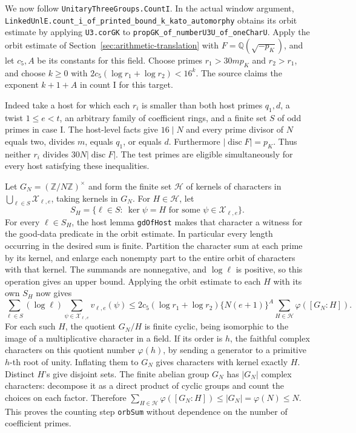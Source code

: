 We now follow \texttt{Unitary\allowbreak{}Three\allowbreak{}Groups.\allowbreak{}Count\allowbreak{}I}. In the actual
window argument, \texttt{Linked\allowbreak{}Unl\allowbreak{}E.\allowbreak{}count\_\allowbreak{}i\_\allowbreak{}of\_\allowbreak{}printed\_\allowbreak{}bound\_\allowbreak{}k\_\allowbreak{}kato\_\allowbreak{}automorphy}
obtains its orbit estimate by applying \texttt{U3.\allowbreak{}cor\allowbreak{}GK} to
\texttt{prop\allowbreak{}GK\_\allowbreak{}of\_\allowbreak{}number\allowbreak{}U3\allowbreak{}U\_\allowbreak{}of\_\allowbreak{}one\allowbreak{}Char\allowbreak{}U}. Apply the orbit estimate
of Section~\ref{sec:arithmetic-translation} with
\(F=\mathbb Q(\sqrt{-p_K})\), and let \(c_5,A\) be its constants for
this field. Choose primes \(r_1>30mp_K\) and \(r_2>r_1\), and choose
\(k\ge0\) with \(2c_5(\log r_1+\log r_2)<16^k\). The source
claims the exponent \(k+1+A\) in count I for this target.

Indeed take a host for which each \(r_i\) is smaller than both
host primes \(q_1,d\), a twist \(1\le e<t\), an arbitrary family of
coefficient rings, and a finite set \(S\) of odd primes in case I.
The host-level facts give \(16\mid N\) and every prime divisor of
\(N\) equals two, divides \(m\), equals \(q_1\), or equals \(d\).
Furthermore \(|\operatorname{disc}F|=p_K\). Thus neither \(r_i\)
divides \(30N|\operatorname{disc}F|\). The test primes are eligible
simultaneously for every host satisfying these inequalities.

Let \(G_N=(\mathbb Z/N\mathbb Z)^\times\) and form the finite set
\(\mathcal H\) of kernels of characters in
\(\bigcup_{\ell\in S}\mathcal X_{\ell,e}\), taking kernels in \(G_N\).
For \(H\in\mathcal H\), let
\[
  S_H=\{\ell\in S:\ \ker\psi=H
           \text{ for some }\psi\in\mathcal X_{\ell,e}\}.
\]
For every \(\ell\in S_H\), the host lemma \texttt{gd\allowbreak{}Of\allowbreak{}Host} makes that
character a witness for the good-data predicate in the orbit estimate.
In particular every length occurring in the desired sum is finite.
Partition the character sum at each prime by its kernel, and enlarge
each nonempty part to the entire orbit of characters with that kernel.
The summands are nonnegative, and \(\log\ell\) is positive, so this
operation gives an upper bound. Applying the orbit estimate to each
\(H\) with its own \(S_H\) now gives
\[
 \sum_{\ell\in S}(\log\ell)\sum_{\psi\in\mathcal X_{\ell,e}}
       v_{\ell,e}(\psi)
 \le
 2c_5(\log r_1+\log r_2)\{N(e+1)\}^A
        \sum_{H\in\mathcal H}\varphi([G_N:H]).
\]
For each such \(H\), the quotient \(G_N/H\) is finite cyclic, being
isomorphic to the image of a multiplicative character in a field.
If its order is \(h\), the faithful complex characters on this
quotient number \(\varphi(h)\), by sending a generator to a primitive
\(h\)-th root of unity. Inflating them to \(G_N\) gives characters
with kernel exactly \(H\). Distinct \(H\)'s give disjoint sets.
The finite abelian group \(G_N\) has \(|G_N|\) complex characters:
decompose it as a direct product of cyclic groups and count the
choices on each factor. Therefore
\(\sum_{H\in\mathcal H}\varphi([G_N:H])\le |G_N|=\varphi(N)\le N\).
This proves the counting step \texttt{orb\allowbreak{}Sum} without dependence on
the number of coefficient primes.

